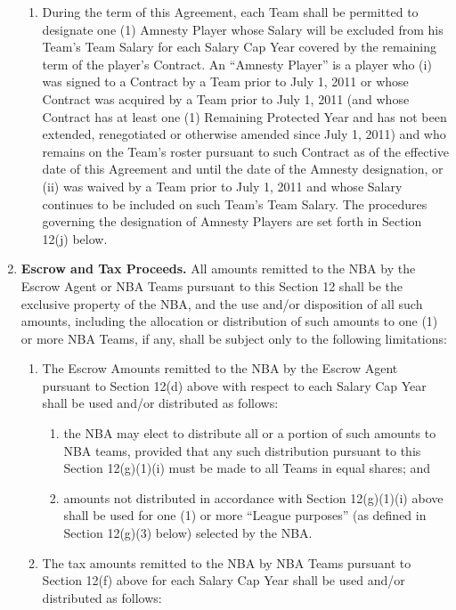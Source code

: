 \documentclass[
]{book}
\providecommand{\tightlist}{%
  \setlength{\itemsep}{0pt}\setlength{\parskip}{0pt}}
\begin{document}
\begin{enumerate}
\begin{enumerate}
  \item
    During the term of this Agreement, each Team shall be permitted to designate one (1) Amnesty Player whose Salary will be excluded from his Team's Team Salary for each Salary Cap Year covered by the remaining term of the player's Contract. An ``Amnesty Player'' is a player who (i) was signed to a Contract by a Team prior to July 1, 2011 or whose Contract was acquired by a Team prior to July 1, 2011 (and whose Contract has at least one (1) Remaining Protected Year and has not been extended, renegotiated or otherwise amended since July 1, 2011) and who remains on the Team's roster pursuant to such Contract as of the effective date of this Agreement and until the date of the Amnesty designation, or (ii) was waived by a Team prior to July 1, 2011 and whose Salary continues to be included on such Team's Team Salary. The procedures governing the designation of Amnesty Players are set forth in Section 12(j) below.
  \end{enumerate}
\item
  \textbf{Escrow and Tax Proceeds.} All amounts remitted to the NBA by the Escrow Agent or NBA Teams pursuant to this Section 12 shall be the exclusive property of the NBA, and the use and/or disposition of all such amounts, including the allocation or distribution of such amounts to one (1) or more NBA Teams, if any, shall be subject only to the following limitations:

  \begin{enumerate}
  \def\labelenumii{(\arabic{enumii})}
  \tightlist
  \item
    The Escrow Amounts remitted to the NBA by the Escrow Agent pursuant to Section 12(d) above with respect to each Salary Cap Year shall be used and/or distributed as follows:

    \begin{enumerate}
    \def\labelenumiii{(\roman{enumiii})}
    \tightlist
    \item
      the NBA may elect to distribute all or a portion of such amounts to NBA teams, provided that any such distribution pursuant to this Section 12(g)(1)(i) must be made to all Teams in equal shares; and
    \item
      amounts not distributed in accordance with Section 12(g)(1)(i) above shall be used for one (1) or more ``League purposes'' (as defined in Section 12(g)(3) below) selected by the NBA.
    \end{enumerate}
  \item
    The tax amounts remitted to the NBA by NBA Teams pursuant to Section 12(f) above for each Salary Cap Year shall be used and/or distributed as follows:


\end{enumerate}
\end{enumerate}
\end{document}
